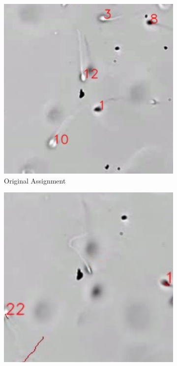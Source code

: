 \begin{figure}[h]
     \centering
     \begin{subfigure}[b]{0.3\textwidth}
         \centering
         \includegraphics[width=\textwidth]{Images/sam5-1.png}
         \caption{Original Assignment}
     \end{subfigure}
     \hfill
     \begin{subfigure}[b]{0.3\textwidth}
         \centering
         \includegraphics[width=\textwidth]{Images/sam5-2.png}

\end{subfigure}
\end{figure}
